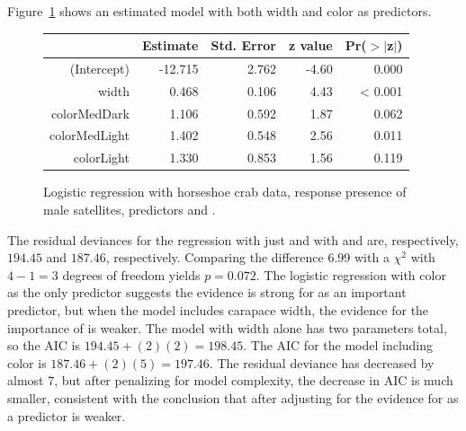 Figure~\ref{figure:satellitesWidthColorCrabsLogReg} shows an estimated model with both width and color as predictors.
\begin{figure}[ht]
\centering
\begin{tabular}{rrrrr}
  \hline
 & Estimate & Std. Error & z value & Pr($>$$|$z$|$) \\
  \hline
(Intercept) & -12.715 & 2.762 & -4.60 & 0.000 \\
  width & 0.468 & 0.106 & 4.43 & < 0.001 \\
  colorMedDark & 1.106 & 0.592 & 1.87 & 0.062 \\
  colorMedLight & 1.402 & 0.548 & 2.56 & 0.011 \\
  colorLight & 1.330 & 0.853 & 1.56 & 0.119 \\
   \hline
\end{tabular}
\caption{Logistic regression with horseshoe crab data, response
       presence of male satellites, predictors  and .}
\label{figure:satellitesWidthColorCrabsLogReg}
\end{figure}

The residual deviances for the regression with just  and with  and  are, respectively, $194.45$ and $187.46$, respectively.  Comparing the difference 6.99 with a $\chi^2$ with $4 - 1 = 3$ degrees of freedom yields $p = 0.072$.  The logistic regression with color as the only predictor suggests the evidence is strong for  as an important predictor, but when the model includes carapace width, the evidence for the importance of  is weaker. The model with width alone has two parameters total, so the AIC is $194.45 + (2)(2) = 198.45$. The AIC for the model including color is $187.46 + (2)(5) = 197.46$.  The residual deviance has decreased by almost 7, but after penalizing for model complexity, the decrease in AIC is much smaller, consistent with the conclusion that after adjusting for  the evidence for  as a predictor is weaker.







